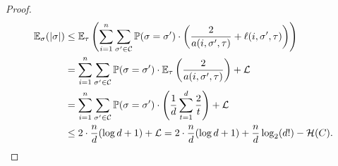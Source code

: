 \documentclass[10pt,a4paper]{amsart}
\newcommand{\pr}{\mathbb{P}}
\newcommand{\ev}{\mathbb{E}}
\newcommand{\ent}{\mathcal{H}}
\newcommand{\cL}{\mathcal L}
\newcommand{\C}{\mathcal C}
\newcommand{\logt}{\log_2}
\DeclarePairedDelimiter{\abs}{\lvert}{\rvert}
\begin{document}
\begin{proof}
    \begin{align*}
        \ev_\sigma(\abs{\sigma}) & \le \ev_\tau\left(\sum_{i=1}^n \sum_{\sigma' \in \C} \pr(\sigma = \sigma') \cdot \left(\frac{2}{a(i,\sigma',\tau)} + \ell(i,\sigma',\tau)\right)\right) \\
        & = \sum_{i=1}^n \sum_{\sigma' \in \C} \pr(\sigma = \sigma') \cdot \ev_\tau\left(\frac{2}{a(i,\sigma',\tau)}\right) + \cL \\
        & = \sum_{i=1}^n \sum_{\sigma' \in \C} \pr(\sigma = \sigma') \cdot \left(\frac{1}{d} \sum_{t = 1}^d \frac{2}{t}\right) + \cL \\
        & \le 2 \cdot \frac{n}{d} (\log d + 1) + \cL = 2 \cdot \frac{n}{d} (\log d + 1) + \frac{n}{d} \logt(d!) - \ent(C). \qedhere
    \end{align*}
\end{proof}
\end{document}
